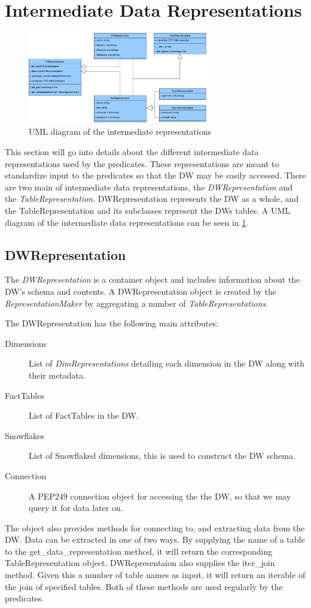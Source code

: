 \section{Intermediate Data Representations}
\begin{figure}
\centering
\includegraphics[width=0.7\textwidth]{figures/dwrep_uml.pdf}
\caption{UML diagram of the intermediate representations}
\label{fig:dwrep}
\end{figure}

This section will go into details about the different intermediate data representations used by the predicates. These representations are meant to standardize input to the predicates so that the DW may be easily accessed. There are two main of intermediate data representations, the \textit{DWRepresentation} and the \textit{TableRepresentation}. DWRepresentation represents the DW as a whole, and the TableRepresentation and its subclasses represent the DWs tables. A UML diagram of the intermediate data representations can be seen in \cref{fig:dwrep}.

\subsection{DWRepresentation}
The \textit{DWRepresentation} is a container object and includes information about the DW's schema and contents. A DWRepresentation object is created by the \textit{RepresentationMaker} by aggregating a number of \textit{TableRepresentations}.

The DWRepresentation has the following main attributes:

\begin{description}
\item[Dimensions] List of \textit{DimRepresentations} detailing each dimension in the DW along with their metadata.
\item[FactTables] List of FactTables in the DW.
\item[Snowflakes] List of Snowflaked dimensions, this is used to construct the DW schema.
\item[Connection] A PEP249 connection object for accessing the the DW, so that we may query it for data later on.
\end{description}
The object also provides methods for connecting to, and extracting data from the DW. Data can be extracted in one of two ways. By supplying the name of a table to the get\_data\_representation method, it will return the corresponding TableRepresentation object. DWRepresentaion also supplies the iter\_join method. Given this a number of table names as input, it will return an iterable of the join of specified tables. Both of these methods are used regularly by the predicates.

